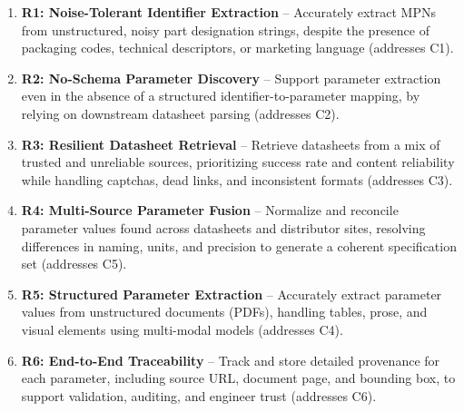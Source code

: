 \begin{enumerate}
\item \textbf{R1: Noise-Tolerant Identifier Extraction} – Accurately extract MPNs from unstructured, noisy part designation strings, despite the presence of packaging codes, technical descriptors, or marketing language (addresses C1).

\item \textbf{R2: No-Schema Parameter Discovery} – Support parameter extraction even in the absence of a structured identifier-to-parameter mapping, by relying on downstream datasheet parsing (addresses C2).

\item \textbf{R3: Resilient Datasheet Retrieval} – Retrieve datasheets from a mix of trusted and unreliable sources, prioritizing success rate and content reliability while handling captchas, dead links, and inconsistent formats (addresses C3).

\item \textbf{R4: Multi-Source Parameter Fusion} – Normalize and reconcile parameter values found across datasheets and distributor sites, resolving differences in naming, units, and precision to generate a coherent specification set (addresses C5).

\item \textbf{R5: Structured Parameter Extraction} – Accurately extract parameter values from unstructured documents (PDFs), handling tables, prose, and visual elements using multi-modal models (addresses C4).

\item \textbf{R6: End-to-End Traceability} – Track and store detailed provenance for each parameter, including source URL, document page, and bounding box, to support validation, auditing, and engineer trust (addresses C6).
\end{enumerate}




